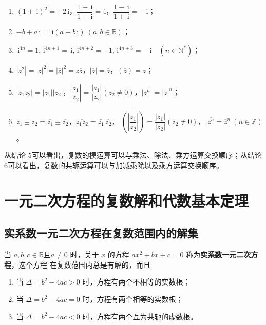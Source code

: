 \documentclass[a4paper,openany]{ctexbook}
\newcommand{\ii}{\,\mathrm{i}}
\begin{document}
\begin{enumerate}
    \item \((1 \pm \ii)^2=\pm 2 \ii\)，\(\dfrac{1+\ii}{1-\ii}=\ii\)，\(\dfrac{1-\ii}{1+\ii}=-\ii\)；
    \item \(-b+a\,\mathrm{i}=\ii(a+b\,\mathrm{i}) \ (a,b \in \mathbb{R} )\)；
    \item \(\ii^{4n}=1,\ii^{4n+1}=\ii,\ii^{4n+2}=-1,\ii^{4n+3}=-\ii \quad (n \in \mathbb{N} ^*)\)；
    \item \(|z^2|=|z|^2=|\overline{z}|^2=z \overline{z}\)，\(\left|\overline{z}\right|=\overline{z}\)，\(\overline{(\overline{z})}=z\)；
    \item \(|z_1z_2|=|z_1||z_2|\)，\(\left|\dfrac{z_1}{z_2}\right|=\dfrac{|z_1|}{|z_2|}(z_2 \ne 0)\)，\(|z^n|=|z|^n\)；
    \item \(\overline{z_1 \pm z_2}=\overline{z_1}\pm \overline{z_2}\)，\(\overline{z_1z_2}=\overline{z_1}\, \overline{z_2}\)，
          \(\overline{\left(\left|\dfrac{z_1}{z_2}\right|\right)}=\dfrac{|\overline{z_1}|}{|\overline{z_2}|}(z_2 \ne 0)\)，
          \(\overline{z^n}=\overline{z}^n\ (n \in \mathbb{Z} )\)。
\end{enumerate}

从结论 5可以看出，复数的模运算可以与乘法、除法、乘方运算交换顺序；从结论6可以看出，复数的共轭运算可以与加减乘除以及乘方运算交换顺序。

\section{一元二次方程的复数解和代数基本定理}

\subsection{实系数一元二次方程在复数范围内的解集}

当 \(a,b,c\in \mathbb{R}\text{且}a\ne 0\) 时，关于 \(x\) 的方程 \(ax^2+bx+c=0\) 称为\textbf{实系数一元二次方程}，这个方程
在复数范围内总是有解的，而且
\begin{enumerate}
    \item 当 \(\varDelta=b^2-4ac>0\) 时，方程有两个不相等的实数根；
    \item 当 \(\varDelta=b^2-4ac=0\) 时，方程有两个相等的实数根；
    \item 当 \(\varDelta=b^2-4ac<0\) 时，方程有两个互为共轭的虚数根。
\end{enumerate}
\end{document}
